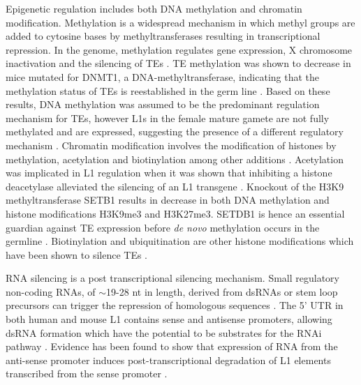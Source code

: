 \documentclass[12pt]{article}
\begin{document}
			Epigenetic regulation includes both DNA methylation and chromatin modification.
			Methylation is a widespread mechanism in which methyl groups are added to cytosine bases by methyltransferases resulting in transcriptional repression.
			In the genome, methylation regulates gene expression, X chromosome inactivation and the silencing of TEs \citep{EnLi14}.
			TE methylation was shown to decrease in mice mutated for DNMT1, a DNA-methyltransferase, indicating that the methylation status of TEs is reestablished in the germ line \citep{Walsh98, Okano99, Bourchis04, Liu14}.
			Based on these results, DNA methylation was assumed to be the predominant regulation mechanism for TEs, however L1s in the female mature gamete are not fully methylated and are expressed, suggesting the presence of a different regulatory mechanism \citep{Peaston04}.	
			Chromatin modification involves the modification of histones by methylation, acetylation and biotinylation among other additions \citep{Eichten14}.
			Acetylation was implicated in L1 regulation when it was shown that inhibiting a histone deacetylase alleviated the silencing of an L1 transgene \citep{Garcia-Perez10}.
			Knockout of the H3K9 methyltransferase SETB1 results in decrease in both DNA methylation and histone modifications H3K9me3 and H3K27me3. 
			SETDB1 is hence an essential guardian against TE expression before \textit{de novo} methylation occurs in the germline \citep{Liu14}.
			Biotinylation and ubiquitination are other histone modifications which have been shown to silence TEs \citep{Chew08,Zempleni09, Sridhar07}. 

			RNA silencing is a post transcriptional silencing mechanism.
			Small regulatory non-coding RNAs, of $\sim$19-28 nt in length, derived from dsRNAs or stem loop precursors can trigger the repression of homologous sequences \citep{Obbard09}.
			The 5' UTR in both human and mouse L1 contains sense and antisense promoters, allowing dsRNA formation which have the potential to be substrates for the RNAi pathway \citep{JingfengLi14,Matlik06}.
			Evidence has been found to show that expression of RNA from the anti-sense promoter induces post-transcriptional degradation of L1 elements transcribed from the sense promoter \citep{Yang06}.
			
\end{document}
